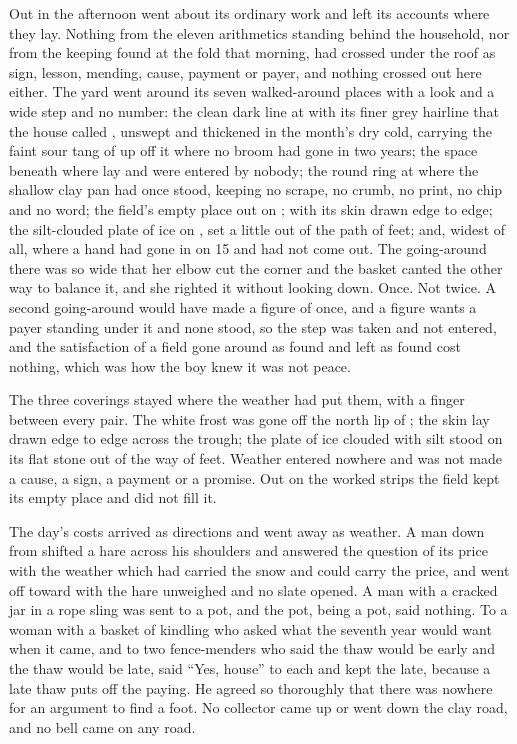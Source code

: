 Out in  the afternoon went about its ordinary work and left its accounts where they lay. Nothing from the eleven arithmetics standing behind the household, nor from the keeping found at the fold that morning, had crossed under the roof as sign, lesson, mending, cause, payment or payer, and nothing crossed out here either. The yard went around its seven walked-around places with a look and a wide step and no number: the clean dark line at  with its finer grey hairline that the house called , unswept and thickened in the month's dry cold, carrying the faint sour tang of  up off it where no broom had gone in two years; the space beneath  where  lay and were entered by nobody; the round ring at  where the shallow clay pan had once stood, keeping no scrape, no crumb, no print, no chip and no word; the field's empty place out on ;  with its skin drawn edge to edge; the silt-clouded plate of ice on , set a little out of the path of feet; and, widest of all,  where a hand had gone in on  15 and had not come out. The going-around there was so wide that her elbow cut the corner and the basket canted the other way to balance it, and she righted it without looking down. Once. Not twice. A second going-around would have made a figure of once, and a figure wants a payer standing under it and none stood, so the step was taken and not entered, and the satisfaction of a field gone around as found and left as found cost nothing, which was how the boy knew it was not peace.

The three coverings stayed where the weather had put them, with a finger between every pair. The white frost was gone off the north lip of ; the skin lay drawn edge to edge across the trough; the plate of ice clouded with silt stood on its flat stone out of the way of feet. Weather entered nowhere and was not made a cause, a sign, a payment or a promise. Out on the worked strips the field kept its empty place and did not fill it.

\scenebreak

The day's costs arrived as directions and went away as weather. A man down from  shifted a hare across his shoulders and answered the question of its price with the weather which had carried the snow and could carry the price, and went off toward  with the hare unweighed and no slate opened. A man with a cracked jar in a rope sling was sent to a pot, and the pot, being a pot, said nothing. To a woman with a basket of kindling who asked what the seventh year would want when it came, and to two fence-menders who said the thaw would be early and the thaw would be late,  said “Yes, house” to each and kept the late, because a late thaw puts off the paying. He agreed so thoroughly that there was nowhere for an argument to find a foot. No collector came up or went down the clay road, and no bell came on any road.

